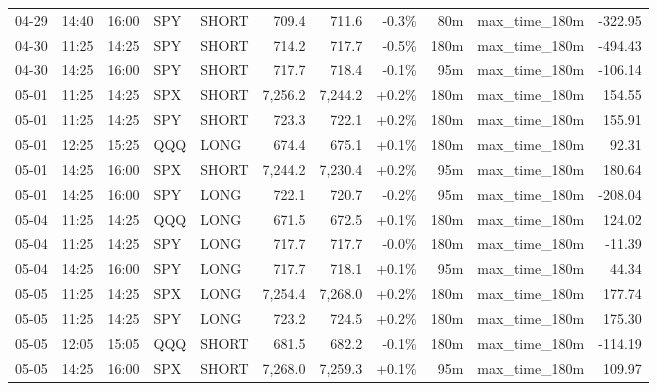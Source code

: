 \documentclass[11pt,a4paper,twoside]{article}
\begin{document}
\begin{center}
\begin{longtable}{>{\color{txtmain}}l l l l l r r r r >{\color{txtmain}}l r}
04-29 & 14:40 & 16:00 & SPY & SHORT & 709.4 & 711.6 & \textcolor{lossred}{-0.3\%} & 80m & max\_time\_180m & \textcolor{lossred}{-322.95} \\
04-30 & 11:25 & 14:25 & SPY & SHORT & 714.2 & 717.7 & \textcolor{lossred}{-0.5\%} & 180m & max\_time\_180m & \textcolor{lossred}{-494.43} \\
04-30 & 14:25 & 16:00 & SPY & SHORT & 717.7 & 718.4 & \textcolor{lossred}{-0.1\%} & 95m & max\_time\_180m & \textcolor{lossred}{-106.14} \\
05-01 & 11:25 & 14:25 & SPX & SHORT & 7,256.2 & 7,244.2 & \textcolor{wingreen}{+0.2\%} & 180m & max\_time\_180m & \textcolor{wingreen}{154.55} \\
05-01 & 11:25 & 14:25 & SPY & SHORT & 723.3 & 722.1 & \textcolor{wingreen}{+0.2\%} & 180m & max\_time\_180m & \textcolor{wingreen}{155.91} \\
05-01 & 12:25 & 15:25 & QQQ & LONG & 674.4 & 675.1 & \textcolor{wingreen}{+0.1\%} & 180m & max\_time\_180m & \textcolor{wingreen}{92.31} \\
05-01 & 14:25 & 16:00 & SPX & SHORT & 7,244.2 & 7,230.4 & \textcolor{wingreen}{+0.2\%} & 95m & max\_time\_180m & \textcolor{wingreen}{180.64} \\
05-01 & 14:25 & 16:00 & SPY & LONG & 722.1 & 720.7 & \textcolor{lossred}{-0.2\%} & 95m & max\_time\_180m & \textcolor{lossred}{-208.04} \\
05-04 & 11:25 & 14:25 & QQQ & LONG & 671.5 & 672.5 & \textcolor{wingreen}{+0.1\%} & 180m & max\_time\_180m & \textcolor{wingreen}{124.02} \\
05-04 & 11:25 & 14:25 & SPY & LONG & 717.7 & 717.7 & \textcolor{lossred}{-0.0\%} & 180m & max\_time\_180m & \textcolor{lossred}{-11.39} \\
05-04 & 14:25 & 16:00 & SPY & LONG & 717.7 & 718.1 & \textcolor{wingreen}{+0.1\%} & 95m & max\_time\_180m & \textcolor{wingreen}{44.34} \\
05-05 & 11:25 & 14:25 & SPX & LONG & 7,254.4 & 7,268.0 & \textcolor{wingreen}{+0.2\%} & 180m & max\_time\_180m & \textcolor{wingreen}{177.74} \\
05-05 & 11:25 & 14:25 & SPY & LONG & 723.2 & 724.5 & \textcolor{wingreen}{+0.2\%} & 180m & max\_time\_180m & \textcolor{wingreen}{175.30} \\
05-05 & 12:05 & 15:05 & QQQ & SHORT & 681.5 & 682.2 & \textcolor{lossred}{-0.1\%} & 180m & max\_time\_180m & \textcolor{lossred}{-114.19} \\
05-05 & 14:25 & 16:00 & SPX & SHORT & 7,268.0 & 7,259.3 & \textcolor{wingreen}{+0.1\%} & 95m & max\_time\_180m & \textcolor{wingreen}{109.97} \\

\end{longtable}
\end{center}
\end{document}
